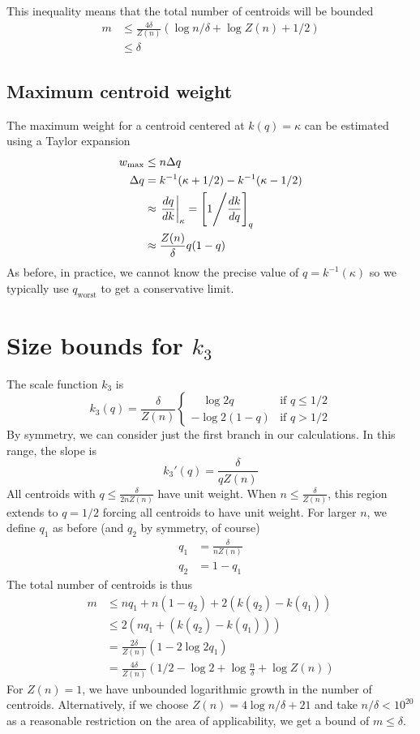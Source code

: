 \documentclass[11pt]{amsart}
\begin{document}
This inequality means that the total number of centroids will be bounded 
\[
\begin{aligned}
m&\le   \frac {4 \delta} {Z(n)} \left(  \log  n/ \delta + \log Z(n) + 1/2\right) \\
&\le  \delta
\end{aligned}
\]
\subsection{Maximum centroid weight}

The maximum weight for a centroid centered at $k(q) = \kappa$ can be estimated using a Taylor expansion
\[
\begin{aligned}
w_{\max} &\le n \Delta q \\
\Delta q &= k^{-1}(\kappa + 1/2) - k^{-1}(\kappa-1/2) \\
&\approx \left . \frac {dq} {dk} \right\rvert_{\kappa} = \left[ 1 \Bigg \slash {\frac {dk} {dq}} \right]_q\\
&\approx \frac {Z(n)} \delta q(1-q) \\
\end{aligned}
\]
As before, in practice, we cannot know the precise value of $q = k^{-1}(\kappa)$ so we typically use $q_{\text {worst}}$ to get a conservative limit.
\section{Size bounds for $k_3$}
The scale function $k_3$ is
\[
k_3(q) = \frac \delta {Z(n)}\begin{cases}
\quad \log 2q & \text{if  } q \le 1/2 \\
- \log 2(1-q) & \text{if  } q > 1/2
\end{cases}
\]
By symmetry, we can consider just the first branch in our calculations. In this range, the slope is
\[
k_3'(q) = \frac \delta { q Z(n)}  
\]
All centroids with $q \le \frac \delta {2 n Z(n)}$ have unit weight. When $n \le \frac \delta {Z(n)}$, this region extends to $q = 1/2$ forcing all centroids to have unit weight. For larger $n$, we define $q_1$ as before (and $q_2$ by symmetry, of course)
\[
\begin{aligned}
q_1 &= \frac \delta { n Z(n)} \\
q_2 &= 1-q_1
\end{aligned}
\]
The total number of centroids is thus
\[
\begin{aligned}
m  &\le  n q_1 + n (1-q_2) + 2(k(q_2) - k(q_1)  ) \\
  &\le 2\left(  n q_1 + (k(q_2) - k(q_1)  ) \right)\\
&= \frac { 2\delta} { Z(n)} \left(1  -2\log 2 q_1\right)\\
&= \frac {4\delta} { Z(n)} \left(1/2- \log 2 + \log  \frac  { n }\delta + \log Z(n)\right)
\end{aligned}
\]
For $Z(n)=1$, we have unbounded logarithmic growth in the number of centroids. Alternatively, if we choose $Z(n) = 4\log n/\delta + 21$  and take $n/\delta < 10^{20}$ as a reasonable restriction on the area of applicability, we get a bound of $m \le \delta$.
\end{document}
